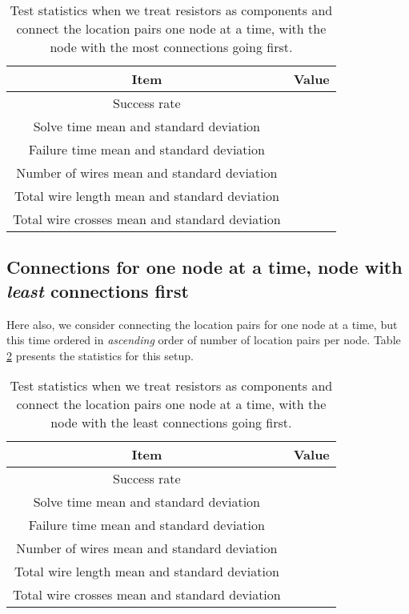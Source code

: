 \begin{table}[H]
\begin{center}
\begin{singlespace}
\begin{tabular}{| c | c |}
\hline
Item & Value \\
\hline\hline
Success rate & \\
Solve time mean and standard deviation & \\
Failure time mean and standard deviation & \\
Number of wires mean and standard deviation & \\
Total wire length mean and standard deviation & \\
Total wire crosses mean and standard deviation & \\
\hline
\end{tabular}
\end{singlespace}
\end{center}
\label{tb:as_comp_node_d}
\caption{Test statistics when we treat resistors as components and connect the
location pairs one node at a time, with the node with the most connections going
first.}
\end{table}

\subsection{Connections for one node at a time, node with \textit{least}
connections first}

Here also, we consider connecting the location pairs for one node at a time,
but this time ordered in \textit{ascending} order of number of location pairs
per node. Table \ref{tb:as_comp_node_a} presents the statistics for this setup.

\begin{table}[H]
\begin{center}
\begin{singlespace}
\begin{tabular}{| c | c |}
\hline
Item & Value \\
\hline\hline
Success rate & \\
Solve time mean and standard deviation & \\
Failure time mean and standard deviation & \\
Number of wires mean and standard deviation & \\
Total wire length mean and standard deviation & \\
Total wire crosses mean and standard deviation & \\
\hline
\end{tabular}
\end{singlespace}
\end{center}
\label{tb:as_comp_node_a}
\caption{Test statistics when we treat resistors as components and connect the
location pairs one node at a time, with the node with the least connections
going first.}
\end{table}


